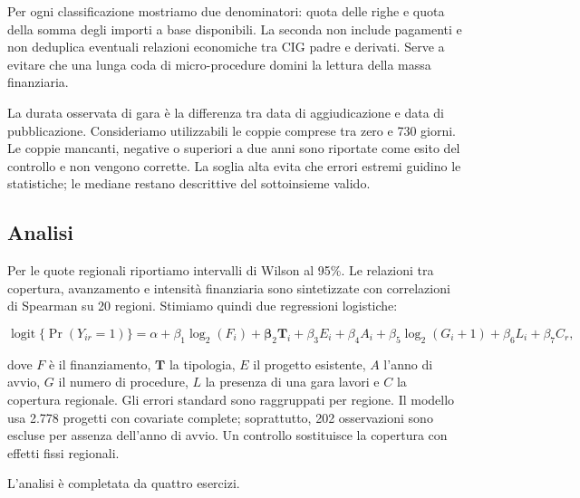 \documentclass[10pt,a4paper]{article}
\begin{document}
Per ogni classificazione mostriamo due denominatori: quota delle righe e quota della somma degli importi a base disponibili. La seconda non include pagamenti e non deduplica eventuali relazioni economiche tra CIG padre e derivati. Serve a evitare che una lunga coda di micro-procedure domini la lettura della massa finanziaria.

La durata osservata di gara è la differenza tra data di aggiudicazione e data di pubblicazione. Consideriamo utilizzabili le coppie comprese tra zero e 730 giorni. Le coppie mancanti, negative o superiori a due anni sono riportate come esito del controllo e non vengono corrette. La soglia alta evita che errori estremi guidino le statistiche; le mediane restano descrittive del sottoinsieme valido.

\subsection{Analisi}

Per le quote regionali riportiamo intervalli di Wilson al 95\%. Le relazioni tra copertura, avanzamento e intensità finanziaria sono sintetizzate con correlazioni di Spearman su 20 regioni. Stimiamo quindi due regressioni logistiche:

\begin{equation}
  \operatorname{logit}\{\Pr(Y_{ir}=1)\}
  = \alpha + \beta_1 \log_2(F_i) + \boldsymbol{\beta}_2 \mathbf{T}_i
  + \beta_3 E_i + \beta_4 A_i + \beta_5 \log_2(G_i+1)
  + \beta_6 L_i + \beta_7 C_r,
\end{equation}

dove $F$ è il finanziamento, $\mathbf{T}$ la tipologia, $E$ il progetto esistente, $A$ l'anno di avvio, $G$ il numero di procedure, $L$ la presenza di una gara lavori e $C$ la copertura regionale. Gli errori standard sono raggruppati per regione. Il modello usa 2.778 progetti con covariate complete; soprattutto, 202 osservazioni sono escluse per assenza dell'anno di avvio. Un controllo sostituisce la copertura con effetti fissi regionali.

L'analisi è completata da quattro esercizi.
\end{document}
